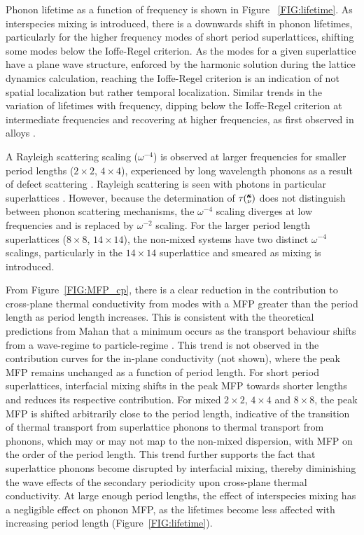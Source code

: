 \documentclass[aps,prb,preprint,preprintnumbers,amsmath,amssymb,floatfix,superscriptaddress]{revtex4}
\newcommand{\kv}{\mspace{-4.0mu}\left(\mspace{-8.0mu}
\begin{smallmatrix}&\pmb{\kappa} \\&\nu\end{smallmatrix}
\mspace{-3.0mu}\right)}
\begin{document}
Phonon lifetime as a function of frequency is shown in Figure ~\ref{FIG:lifetime}. As interspecies mixing is introduced, there is a downwards shift in phonon lifetimes, particularly for the higher frequency modes of short period superlattices, shifting some modes below the Ioffe-Regel criterion. As the modes for a given superlattice have a plane wave structure, enforced by the harmonic solution during the lattice dynamics calculation, reaching the Ioffe-Regel criterion is an indication of not spatial localization but rather temporal localization. Similar trends in the variation of lifetimes with frequency, dipping below the Ioffe-Regel criterion at intermediate frequencies and recovering at higher frequencies, as first observed in alloys \cite{jason2013vc}.

A Rayleigh scattering scaling ($\omega^{-4}$) is observed at larger frequencies for smaller period lengths ($2\times2$, $4\times4$), experienced by long wavelength phonons as a result of defect scattering \cite{PhysRev.140.A1812,klemens_scattering_1955-3,klemens_thermal_1957-2}. Rayleigh scattering is seen with photons in particular superlattices \cite{PhysRevLett.58.2486}. However, because the determination of $\tau\kv$ does not distinguish between phonon scattering mechanisms, the $\omega^{-4}$ scaling diverges at low frequencies and is replaced by $\omega^{-2}$ scaling. For the larger period length superlattices ($8\times8$, $14\times14$), the non-mixed systems have two distinct $\omega^{-4}$ scalings, particularly in the $14\times14$ superlattice and smeared as mixing is introduced.

From Figure~\ref{FIG:MFP_cp}, there is a clear reduction in the contribution to cross-plane thermal conductivity from modes with a MFP greater than the period length as period length increases. This is consistent with the theoretical predictions from Mahan that a minimum occurs as the transport behaviour shifts from a wave-regime to particle-regime \cite{PhysRevLett.84.927,PhysRevB.56.10754}. This trend is not observed in the contribution curves for the in-plane conductivity (not shown), where the peak MFP remains unchanged as a function of period length. For short period superlattices, interfacial mixing shifts in the peak MFP towards shorter lengths and reduces its respective contribution. For mixed $2\times2$, $4\times4$ and $8\times8$, the peak MFP is shifted arbitrarily close to the period length, indicative of the transition of thermal transport from superlattice phonons to thermal transport from phonons, which may or may not map to the non-mixed dispersion, with MFP on the order of the period length. This trend further supports the fact that superlattice phonons become disrupted by interfacial mixing, thereby diminishing the wave effects of the secondary periodicity upon cross-plane thermal conductivity. At large enough period lengths, the effect of interspecies mixing has a negligible effect on phonon MFP, as the lifetimes become less affected with increasing period length (Figure~\ref{FIG:lifetime}).
\end{document}

